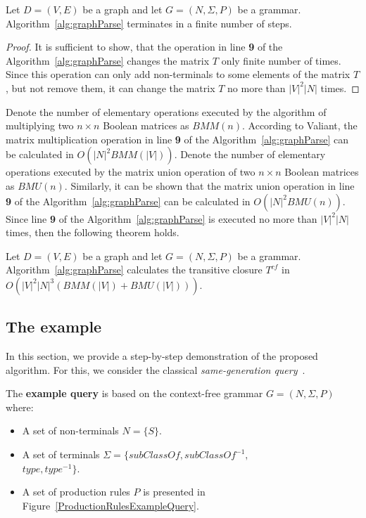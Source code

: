 \begin{mytheorem}\label{thm:finite}
 Let $D = (V,E)$ be a graph and let $G =(N,\Sigma,P)$ be a grammar. Algorithm~\ref{alg:graphParse} terminates in a finite number of steps. 
\end{mytheorem}
\begin{proof}
It is sufficient to show, that the operation in line \textbf{9} of the Algorithm~\ref{alg:graphParse} changes the matrix $T$ only finite number of times. Since this operation can only add non-terminals to some elements of the matrix $T$, but not remove them, it can change the matrix $T$ no more than $|V|^2|N|$ times.
\end{proof}

Denote the number of elementary operations executed by the algorithm of multiplying two $n \times n$ Boolean matrices as $BMM(n)$. According to Valiant, the matrix multiplication operation in line \textbf{9} of the Algorithm~\ref{alg:graphParse} can be calculated in $O(|N|^2 BMM(|V|))$. Denote the number of elementary operations executed by the matrix union operation of two $n \times n$ Boolean matrices as $BMU(n)$. Similarly, it can be shown that the matrix union operation in line \textbf{9} of the Algorithm~\ref{alg:graphParse} can be calculated in $O(|N|^2 BMU(n))$. Since line \textbf{9} of the Algorithm~\ref{alg:graphParse} is executed no more than $|V|^2|N|$ times, then the following theorem holds.

\begin{mytheorem}\label{thm:time}
 Let $D = (V,E)$ be a graph and let $G =(N,\Sigma,P)$ be a grammar. Algorithm~\ref{alg:graphParse} calculates the transitive closure $T^{cf}$ in $O(|V|^2|N|^3(BMM(|V|) + BMU(|V|)))$.
\end{mytheorem}



\subsection{The example} \label{section_example}
In this section, we provide a step-by-step demonstration of the proposed algorithm. For this, we consider the classical \textit{same-generation query}~\cite{FndDB}.

The \textbf{example query} is based on the context-free grammar $G = (N, \Sigma, P)$ where:
\begin{itemize}
    \item A set of non-terminals $N = \{S\}$.
    \item A set of terminals $\Sigma = \{subClassOf, subClassOf^{-1},$ \\ $type, type^{-1}\}$.
    \item A set of production rules $P$ is presented in Figure~\ref{ProductionRulesExampleQuery}.
\end{itemize}


